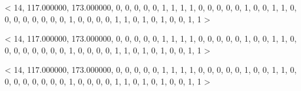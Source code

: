 < 14, 117.000000, 173.000000, 0, 0, 0, 0, 0, 1, 1, 1, 1, 0, 0, 0, 0, 0, 1, 0, 0, 1, 1, 0, 0, 0, 0, 0, 0, 0, 0, 1, 0, 0, 0, 0, 1, 1, 0, 1, 0, 1, 0, 0, 1, 1 > 

< 14, 117.000000, 173.000000, 0, 0, 0, 0, 0, 1, 1, 1, 1, 0, 0, 0, 0, 0, 1, 0, 0, 1, 1, 0, 0, 0, 0, 0, 0, 0, 0, 1, 0, 0, 0, 0, 1, 1, 0, 1, 0, 1, 0, 0, 1, 1 > 

< 14, 117.000000, 173.000000, 0, 0, 0, 0, 0, 1, 1, 1, 1, 0, 0, 0, 0, 0, 1, 0, 0, 1, 1, 0, 0, 0, 0, 0, 0, 0, 0, 1, 0, 0, 0, 0, 1, 1, 0, 1, 0, 1, 0, 0, 1, 1 > 